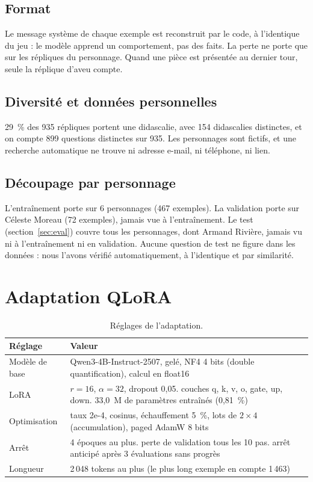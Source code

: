 \documentclass[11pt,a4paper]{article}
\begin{document}
\subsection{Format}

Le message système de chaque exemple est reconstruit par le code, à l'identique du jeu : le modèle apprend un comportement, pas des faits. La perte ne porte que sur les répliques du personnage. Quand une pièce est présentée au dernier tour, seule la réplique d'aveu compte.

\subsection{Diversité et données personnelles}

29~\% des 935 répliques portent une didascalie, avec 154 didascalies distinctes, et on compte 899 questions distinctes sur 935. Les personnages sont fictifs, et une recherche automatique ne trouve ni adresse e-mail, ni téléphone, ni lien.

\subsection{Découpage par personnage}

L'entraînement porte sur 6 personnages (467 exemples). La validation porte sur Céleste Moreau (72 exemples), jamais vue à l'entraînement. Le test (section~\ref{sec:eval}) couvre tous les personnages, dont Armand Rivière, jamais vu ni à l'entraînement ni en validation. Aucune question de test ne figure dans les données : nous l'avons vérifié automatiquement, à l'identique et par similarité.

\section{Adaptation QLoRA}

\begin{table}[h]
\centering
\small
\begin{tabularx}{\textwidth}{@{}lX@{}}
\toprule
Réglage & Valeur \\
\midrule
Modèle de base & Qwen3-4B-Instruct-2507, gelé, NF4 4 bits (double quantification), calcul en float16 \\
LoRA & $r = 16$, $\alpha = 32$, dropout 0,05. couches q, k, v, o, gate, up, down. 33,0~M de paramètres entraînés (0,81~\%) \\
Optimisation & taux 2e-4, cosinus, échauffement 5~\%, lots de $2 \times 4$ (accumulation), paged AdamW 8 bits \\
Arrêt & 4 époques au plus. perte de validation tous les 10 pas. arrêt anticipé après 3 évaluations sans progrès \\
Longueur & 2\,048 tokens au plus (le plus long exemple en compte 1\,463) \\
\bottomrule
\end{tabularx}
\caption{Réglages de l'adaptation.}
\end{table}
\end{document}
